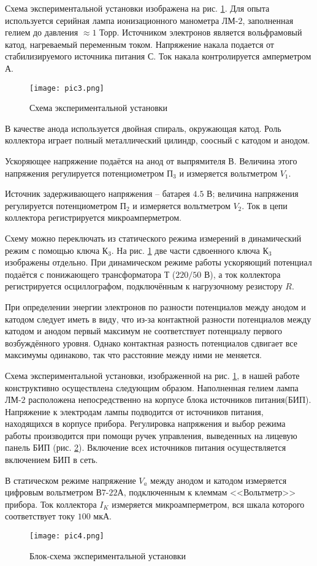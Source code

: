 Схема экспериментальной установки изображена на рис. \ref{pic3}. Для опыта
используется серийная лампа ионизационного манометра ЛМ-$2$, заполненная гелием
до давления $\approx 1$ Торр. Источником электронов является вольфрамовый катод,
нагреваемый переменным током. Напряжение накала подается от стабилизируемого
источника питания С. Ток накала контролируется амперметром А.

\begin{figure}[h]
  \center
  \texttt{[image: pic3.png]}
  \caption{ Схема экспериментальной установки }
  \label{pic3}
\end{figure}

В качестве анода используется двойная спираль, окружающая катод. Роль коллектора
играет полный металлический цилиндр, соосный с катодом и анодом.

Ускоряющее напряжение подаётся на анод от выпрямителя В. Величина этого
напряжения регулируется потенциометром $\text{П}_3$ и измеряется вольтметром
$V_1$.

Источник задерживающего напряжения -- батарея $4.5$ В; величина напряжения
регулируется потенциометром $\text{П}_2$ и измеряется вольтметром $V_2$. Ток в
цепи коллектора регистрируется микроамперметром.

Схему можно переключать из статического режима измерений в динамический режим с
помощью ключа $\text{К}_3$. На рис. \ref{pic3} две части сдвоенного ключа
$\text{К}_3$ изображены отдельно. При динамическом режиме работы ускоряющий
потенциал подаётся с понижающего трансформатора Т ($220/50$ В), а ток коллектора
регистрируется осциллографом, подключённым к нагрузочному резистору $R$.

При определении энергии электронов по разности потенциалов между анодом и
катодом следует иметь в виду, что из-за контактной разности потенциалов между
катодом и анодом первый максимум не соответствует потенциалу первого
возбуждённого уровня. Однако контактная разность потенциалов сдвигает все
максимумы одинаково, так что расстояние между ними не меняется.

Схема экспериментальной установки, изображенной на рис. \ref{pic3}, в нашей
работе конструктивно осуществлена следующим образом. Наполненная гелием лампа
ЛМ-$2$ расположена непосредственно на корпусе блока источников питания(БИП).
Напряжение к электродам лампы подводится от источников питания, находящихся в
корпусе прибора. Регулировка напряжения и выбор режима работы производится при
помощи ручек управления, выведенных на лицевую панель БИП (рис. \ref{pic4}).
Включение всех источников питания осуществляется включением БИП в сеть.

В статическом режиме напряжение $V_a$ между анодом и катодом измеряется цифровым
вольтметром В$7$-$22$А, подключенным к клеммам <<Вольтметр>> прибора. Ток
коллектора $I_K$ измеряется микроамперметром, вся шкала которого соответствует
току $100$ мкА.

\begin{figure}[h]
  \center
  \texttt{[image: pic4.png]}
  \caption{ Блок-схема экспериментальной установки }
  \label{pic4}
\end{figure}
